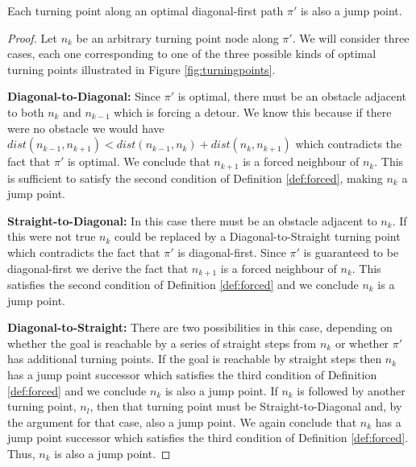 

\begin{lemma}
\label{lemma:turningpoints}
Each turning point along an optimal diagonal-first path $\pi'$ is also a jump point.
\end{lemma}
\begin{proof}
Let $n_{k}$ be an arbitrary turning point node along $\pi'$. 
We will consider three cases, each one corresponding to one of the three
possible kinds of optimal turning points illustrated in Figure \ref{fig:turningpoints}. 

\textbf{Diagonal-to-Diagonal:} Since $\pi'$ is optimal, there must be an
obstacle adjacent to both $n_{k}$ and $n_{k-1}$ which is forcing a detour.
We know this because if there were no obstacle we would have 
$dist(n_{k-1}, n_{k+1}) < dist(n_{k-1}, n_{k}) + dist(n_{k}, n_{k+1})$ which contradicts
the fact that $\pi'$ is optimal.
We conclude that $n_{k+1}$ is a forced neighbour of $n_{k}$.
This is sufficient to satisfy the second condition of Definition
\ref{def:forced}, making $n_{k}$ a jump point.

\textbf{Straight-to-Diagonal:} In this case there must be an 
obstacle adjacent to $n_{k}$. 
If this were not true $n_{k}$ could be replaced by a
Diagonal-to-Straight turning point which contradicts the fact that $\pi'$ is
diagonal-first.
Since $\pi'$ is guaranteed to be diagonal-first we derive the fact that $n_{k+1}$ is 
a forced neighbour of $n_{k}$.
This satisfies the second condition of Definition \ref{def:forced} and we conclude
$n_{k}$ is a jump point.

\textbf{Diagonal-to-Straight:} There are two possibilities in this case, 
depending on whether the goal is reachable by a series of straight steps
from $n_{k}$ or whether $\pi'$ has additional turning points. If the goal
is reachable by straight steps then $n_{k}$ has a jump point successor which satisfies the
third condition of Definition \ref{def:forced} and we conclude $n_{k}$ is
also a jump point.
If $n_{k}$ is followed by another turning point, $n_{l}$, then that turning
point must be Straight-to-Diagonal and, by the argument for that case, 
also a jump point.
We again conclude that $n_{k}$ has a jump point successor which satisfies
the third condition of Definition \ref{def:forced}. Thus, $n_{k}$ is
also a jump point.
\end{proof}

